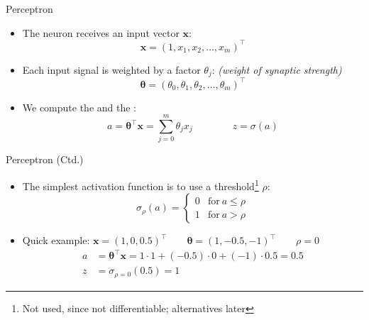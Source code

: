 \begin{frame}{Perceptron}{}
	\begin{itemize}
		\item The neuron receives an input vector $\bm{x}$:
		\begin{equation*}
			\bm{x} = (1, x_1, x_2, \dots, x_m)^{\intercal}
		\end{equation*}
		\item Each input signal is weighted by a factor $\theta_j$: {\footnotesize\textit{(weight of synaptic strength)}}
		\begin{equation*}
			\bm{\theta} = (\theta_0, \theta_1, \theta_2, \dots, \theta_m)^{\intercal}
		\end{equation*}
		\item We compute the  and the :
		\begin{equation}
			a = \bm{\theta}^{\intercal} \bm{x} = \sum_{j=0}^m \theta_j x_j \qquad\qquad
			z = \sigma(a)
		\end{equation}
	\end{itemize}
\end{frame}


\begin{frame}{Perceptron (Ctd.)}{}
	\begin{itemize}
		\item The simplest activation function is to use a threshold\footnote[frame]{Not used, since not differentiable;
			alternatives later} $\rho$:
		\begin{equation*}
			\sigma_{\rho}(a) =
			\begin{cases}
				0 &	\text{for}\ a \le \rho \\
				1 & \text{for}\ a > \rho
			\end{cases}
		\end{equation*}
		\item Quick example: $\bm{x} = (1, 0, 0.5)^{\intercal} \qquad \bm{\theta} = (1, -0.5, -1)^{\intercal} \qquad \rho = 0$
		\begin{align*}
			a &= \bm{\theta}^{\intercal}\bm{x} = 1 \cdot 1 + (-0.5) \cdot 0 + (-1) \cdot 0.5 = 0.5 \\
			z &= \sigma_{\rho=0}(0.5) = 1
		\end{align*}
	\end{itemize}
\end{frame}


